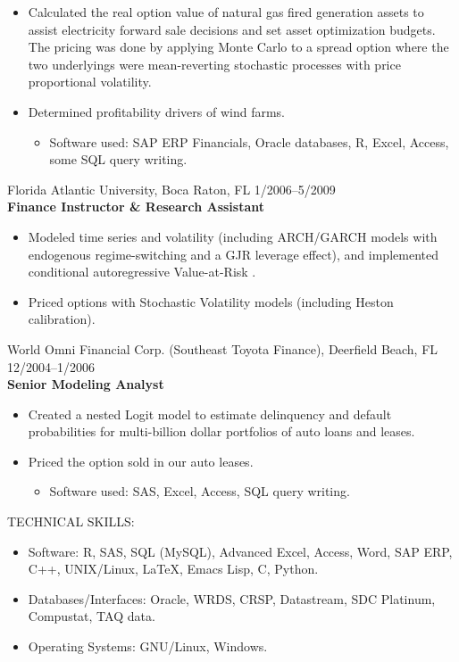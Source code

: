 \documentclass[9pt]{article}
\begin{document}
\begin{itemize}[noitemsep, nolistsep]
\item Calculated the real option value of natural gas fired generation assets to assist electricity forward sale decisions and set asset optimization budgets.  The pricing was done by applying Monte Carlo to a spread option where the two underlyings were mean-reverting stochastic processes with price proportional volatility.
\item Determined profitability drivers of wind farms.
\begin{itemize}[noitemsep, nolistsep]
\item Software used: SAP ERP Financials, Oracle databases, R, Excel, Access, some SQL query writing.
\end{itemize}
\end{itemize}
\vspace{5pt}
Florida Atlantic University, Boca Raton, FL \hfill  \hfill 1/2006--5/2009\\
{\bf Finance Instructor \& Research Assistant}
\begin{itemize}[noitemsep, nolistsep]
\item Modeled time series and volatility (including ARCH/GARCH models with endogenous regime-switching and a GJR leverage effect), and implemented conditional autoregressive Value-at-Risk .
\item Priced options with Stochastic Volatility models (including Heston calibration).
\end{itemize}
\vspace{5pt}
World Omni Financial Corp. (Southeast Toyota Finance), Deerfield Beach, FL \hfill  \hfill 12/2004--1/2006\\
{\bf Senior Modeling Analyst}
\begin{itemize}[noitemsep, nolistsep]
\item Created a nested Logit model to estimate delinquency and default probabilities for multi-billion dollar portfolios of auto loans and leases.
\item Priced the option sold in our auto leases.
\begin{itemize}[noitemsep, nolistsep]
\item Software used:  SAS, Excel, Access, SQL query writing.
\end{itemize}
\end{itemize}
\vspace{10pt}
TECHNICAL SKILLS:
\begin{itemize}[noitemsep, nolistsep]
\item Software: R, SAS, SQL (MySQL), Advanced Excel, Access, Word, SAP ERP, C++, UNIX/Linux, \LaTeX, Emacs Lisp, C, Python. 
\item Databases/Interfaces: Oracle, WRDS, CRSP, Datastream, SDC Platinum, Compustat, TAQ data.
\item Operating Systems: GNU/Linux, Windows.
\end{itemize}
\end{document}
